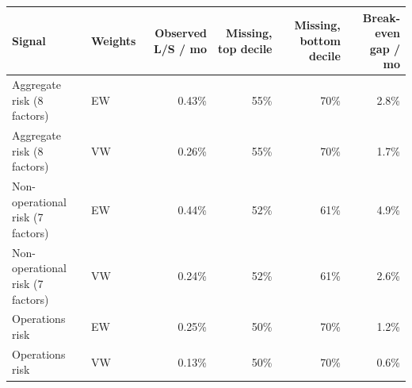 \begin{tabular}{llrrrr}
\toprule
Signal & Weights & Observed L/S / mo & Missing, top decile & Missing, bottom decile & Break-even gap / mo \\
\midrule
Aggregate risk (8 factors) & EW & 0.43\% & 55\% & 70\% & 2.8\% \\
Aggregate risk (8 factors) & VW & 0.26\% & 55\% & 70\% & 1.7\% \\
Non-operational risk (7 factors) & EW & 0.44\% & 52\% & 61\% & 4.9\% \\
Non-operational risk (7 factors) & VW & 0.24\% & 52\% & 61\% & 2.6\% \\
Operations risk & EW & 0.25\% & 50\% & 70\% & 1.2\% \\
Operations risk & VW & 0.13\% & 50\% & 70\% & 0.6\% \\
\bottomrule
\end{tabular}
